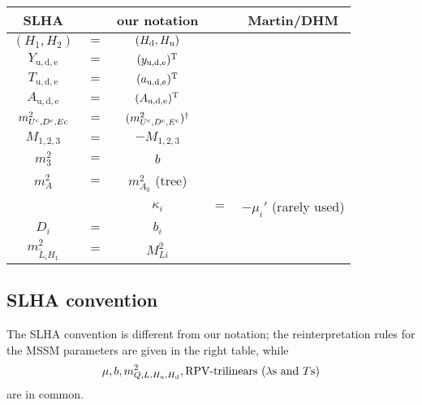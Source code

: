 \documentclass[CheatSheet]{subfiles}
\begin{document}
\begin{wraptable}{r}{200pt}\vspace{-3em}
 \begin{tabular}[t]{c@{\,}c@{\,}c@{\,}c@{\,}c}\toprule
 SLHA  && our notation && Martin/DHM\\\midrule
 $(H_1, H_2)$              &$=$& $(H_{\mathrm{d}}, H_{\mathrm{u}})$ \\\midrule
 $Y_{\mathrm{u,d,e}}$      &$=$& $(y_{\mathrm{u,d,e}})^{\mathrm{T}}$\\
 $T_{\mathrm{u,d,e}}$      &$=$& $(a_{\mathrm{u,d,e}})^{\mathrm{T}}$\\
 $A_{\mathrm{u,d,e}}$      &$=$& $(A_{\mathrm{u,d,e}})^{\mathrm{T}}$\\
 $m^2_{U^{\mathrm{c}},D^{\mathrm{c}}, E\mathrm{c}}$ &$=$& $(m^2_{U^{\mathrm{c}},D^{\mathrm{c}}, E^{\mathrm{c}}})^\dagger$\\
 $M_{1,2,3}$               &$=$& $-M_{1,2,3}$\\
 $m_3^2$                   &$=$& $b$\\
 $m_A^2$                   &$=$& $m^2_{A_0}$ (tree)\\\midrule
                           && $\kappa_i$ &$=$& $-\mu_i'$ \footnotesize{(rarely used)}\\
 $D_i$                     &$=$& $b_i$\\
 $m^2_{\tilde L_iH_1}$     &$=$& $M^2_{Li}$ \\\bottomrule
 \end{tabular}
\end{wraptable}

\subsection{SLHA convention}
The SLHA convention \cite{SLHA} is different from our notation; the reinterpretation rules for the MSSM parameters are given in the right table, while
\begin{equation*}
  \mu, b, m^2_{Q, L, H_{\mathrm{u}}, H_{\mathrm{d}}}, \text{RPV-trilinears ($\lambda$s and $T$s)}
\end{equation*}
 are in common.
\end{document}
